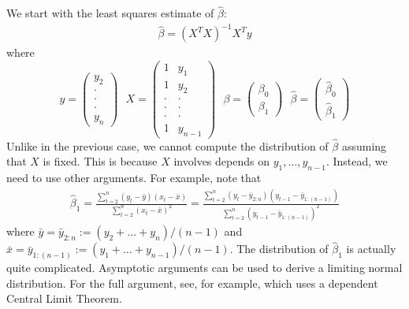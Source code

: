 \documentclass{scrartcl}
\begin{document}
We start with the least squares estimate of $\hat{\beta}$:
\begin{align*}
  \hat{\beta} = (X^T X)^{-1} X^T y
\end{align*}
where
\begin{equation*}
  y =
  \begin{pmatrix}
    y_2 \\ \cdot \\ \cdot \\ \cdot \\ y_n
  \end{pmatrix} ~~~ X =
  \begin{pmatrix}
    1  & y_1\\
    1 & y_2 \\
    \cdot & \cdot \\
    \cdot & \cdot \\
    \cdot & \cdot \\
    1 & y_{n-1} 
  \end{pmatrix} ~~~
  \beta =
  \begin{pmatrix}
    \beta_0 \\ \beta_1 
  \end{pmatrix} ~~~
  \hat{\beta} =
  \begin{pmatrix}
    \hat{\beta}_0 \\ \hat{\beta}_1
  \end{pmatrix}
\end{equation*}
Unlike in the previous case, we cannot compute the distribution of
$\hat{\beta}$ assuming that $X$ is fixed. This is because $X$ involves
depends on $y_1, \dots, y_{n-1}$. Instead, we need to use other
arguments. For example, note that
\begin{align*}
  \hat{\beta}_1 = \frac{\sum_{t=2}^n (y_t - \bar{y})(x_t -
  \bar{x})}{\sum_{t=2}^n (x_t - \bar{x})^2} = \frac{\sum_{t=2}^n (y_t
  - \bar{y}_{2:n})(y_{t-1} - 
  \bar{y}_{1:(n-1)})}{\sum_{t=2}^n (y_{t-1} - \bar{y}_{1:(n-1)})^2}  
\end{align*}
where $\bar{y} = \bar{y}_{2:n} := (y_2 + \dots + y_n)/(n-1)$ and
$\bar{x} = \bar{y}_{1:(n-1)} := (y_1 +
\dots + y_{n-1})/(n-1)$. The distribution of $\hat{\beta}_1$ is
actually quite complicated. Asymptotic arguments can be used to derive
a limiting normal distribution. For the full argument, see, for
example, \citet[Subsection B.3]{ShumwayStoffer} which uses a dependent
Central Limit Theorem.
\end{document}
